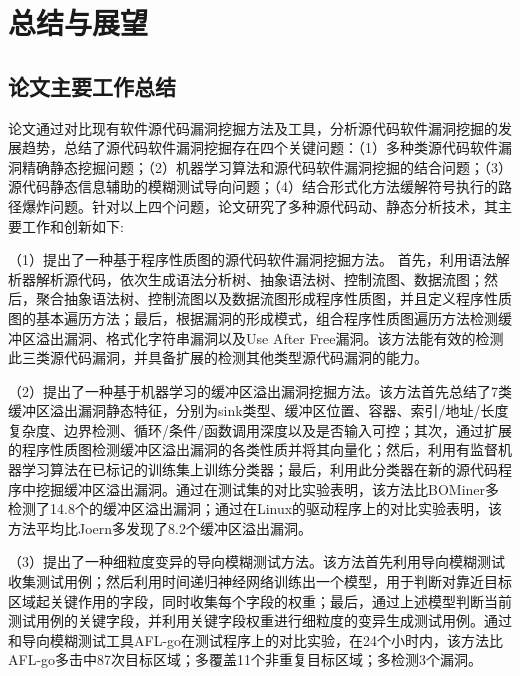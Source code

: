 \chapter{总结与展望}

\section{论文主要工作总结}

论文通过对比现有软件源代码漏洞挖掘方法及工具，分析源代码软件漏洞挖掘的发展趋势，总结了源代码软件漏洞挖掘存在四个关键问题：（1）多种类源代码软件漏洞精确静态挖掘问题；（2）机器学习算法和源代码软件漏洞挖掘的结合问题；（3）源代码静态信息辅助的模糊测试导向问题；（4）结合形式化方法缓解符号执行的路径爆炸问题。针对以上四个问题，论文研究了多种源代码动、静态分析技术，其主要工作和创新如下:

（1）提出了一种基于程序性质图的源代码软件漏洞挖掘方法。
首先，利用语法解析器解析源代码，依次生成语法分析树、抽象语法树、控制流图、数据流图；然后，聚合抽象语法树、控制流图以及数据流图形成程序性质图，并且定义程序性质图的基本遍历方法；最后，根据漏洞的形成模式，组合程序性质图遍历方法检测缓冲区溢出漏洞、格式化字符串漏洞以及Use After Free漏洞。该方法能有效的检测此三类源代码漏洞，并具备扩展的检测其他类型源代码漏洞的能力。

（2）提出了一种基于机器学习的缓冲区溢出漏洞挖掘方法。该方法首先总结了7类缓冲区溢出漏洞静态特征，分别为sink类型、缓冲区位置、容器、索引/地址/长度复杂度、边界检测、循环/条件/函数调用深度以及是否输入可控；其次，通过扩展的程序性质图检测缓冲区溢出漏洞的各类性质并将其向量化；然后，利用有监督机器学习算法在已标记的训练集上训练分类器；最后，利用此分类器在新的源代码程序中挖掘缓冲区溢出漏洞。通过在测试集的对比实验表明，该方法比BOMiner多检测了14.8个的缓冲区溢出漏洞；通过在Linux的驱动程序上的对比实验表明，该方法平均比Joern多发现了8.2个缓冲区溢出漏洞。


（3）提出了一种细粒度变异的导向模糊测试方法。该方法首先利用导向模糊测试收集测试用例；然后利用时间递归神经网络训练出一个模型，用于判断对靠近目标区域起关键作用的字段，同时收集每个字段的权重；最后，通过上述模型判断当前测试用例的关键字段，并利用关键字段权重进行细粒度的变异生成测试用例。通过和导向模糊测试工具AFL-go在测试程序上的对比实验，在24个小时内，该方法比AFL-go多击中87次目标区域；多覆盖11个非重复目标区域；多检测3个漏洞。


